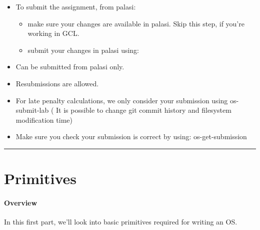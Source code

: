 \documentclass[]{book}
\newenvironment{Shaded}{}{}
\newcommand{\KeywordTok}[1]{\textbf{{#1}}}
\newcommand{\NormalTok}[1]{{#1}}
\begin{document}
\begin{itemize}
\itemsep1pt\parskip0pt
\item
  To submit the assignment, from palasi:

  \begin{itemize}
  \item
    make sure your changes are available in palasi. Skip this step, if
    you're working in GCL.
  \item
    submit your changes in palasi using:

\begin{Shaded}
\end{Shaded}
  \end{itemize}
\item
  Can be submitted from palasi only.
\item
  Resubmissions are allowed.
\item
  For late penalty calculations, we only consider your submission using
  os-submit-lab ( It is possible to change git commit history and
  filesystem modification time)
\item
  Make sure you check your submission is correct by using:
  os-get-submission
\end{itemize}

\begin{center}\rule{0.5\linewidth}{\linethickness}\end{center}

\chapter{Primitives}\label{primitives}

\subsubsection*{Overview}\label{overview}

In this first part, we'll look into basic primitives required for
writing an OS.
\end{document}
